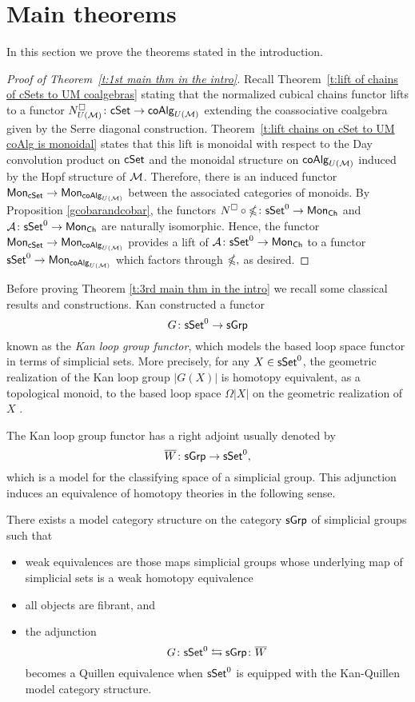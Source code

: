
\section{Main theorems}

In this section we prove the theorems stated in the introduction. 

\begin{proof}[Proof of Theorem~\ref{t:1st main thm in the intro}]
    Recall Theorem~\ref{t:lift of chains of cSets to UM coalgebras} stating that the normalized cubical chains functor lifts to a functor $N^{\square}_{U(\mathcal{M})} \colon \mathsf{cSet} \to \mathsf{coAlg}_{U(\mathcal{M})}$ extending the coassociative coalgebra given by the Serre diagonal construction.
    Theorem~\ref{t:lift chains on cSet to UM coAlg is monoidal} states that this lift is  monoidal with respect to the Day convolution product on $\mathsf{cSet}$ and the monoidal structure on $\mathsf{coAlg}_{U(\mathcal{M})}$ induced by the Hopf structure of $\mathcal{M}$.
    Therefore, there is an induced functor $\mathsf{Mon}_{\mathsf{cSet}} \to \mathsf{Mon}_{\mathsf{coAlg}_{U(\mathcal{M})}}$ between the associated categories of monoids.
    By Proposition \ref{gcobarandcobar}, the functors $N^{\square} \circ \mathbb{\Omega} \colon \mathsf{sSet}^0 \to \mathsf{Mon}_{\mathsf{Ch}}$ and $\mathcal{A} \colon \mathsf{sSet}^0 \to \mathsf{Mon}_{\mathsf{Ch}}$ are naturally isomorphic.
    Hence, the functor $\mathsf{Mon}_{\mathsf{cSet}} \to \mathsf{Mon}_{\mathsf{coAlg}_{U(\mathcal{M})}}$ provides a lift of $\mathcal{A} \colon \mathsf{sSet}^0 \to \mathsf{Mon}_{\mathsf{Ch}}$ to a functor  $\mathsf{sSet}^0 \to \mathsf{Mon}_{\mathsf{coAlg}_{U(\mathcal{M})}}$ which factors through $\mathbb{\Omega},$ as desired.
\end{proof}

Before proving Theorem \ref{t:3rd main thm in the intro} we recall some classical results and constructions. 
Kan constructed a functor $$G\colon \mathsf{sSet}^0 \to \mathsf{sGrp}$$ known as the \textit{Kan loop group functor}, which models the based loop space functor in terms of simplicial sets. More precisely, for any $X \in \mathsf{sSet}^0$, the geometric realization of the Kan loop group $|G(X)|$ is homotopy equivalent, as a topological monoid, to the based loop space $\Omega|X|$ on the geometric realization of $X$ \cite{Berger}. 


The Kan loop group functor has a right adjoint usually denoted by 
$$\overline{W} \colon \mathsf{sGrp} \to \mathsf{sSet}^0,$$ which is a model for the classifying space of a simplicial group. This adjunction induces an equivalence of homotopy theories in the following sense.

\begin{theorem} \label{kan} There exists a model category structure on the category $\mathsf{sGrp}$ of simplicial groups such that 
\begin{itemize}
    \item weak equivalences are those maps simplicial groups whose underlying map of simplicial sets is a weak homotopy equivalence
    \item all objects are fibrant, and
\item the adjunction
$$G \colon \mathsf{sSet}^0 \leftrightarrows \mathsf{sGrp}\colon \overline{W}$$
becomes a Quillen equivalence when $\mathsf{sSet}^0$ is equipped with the Kan-Quillen model category structure.
\end{itemize}
\end{theorem}


